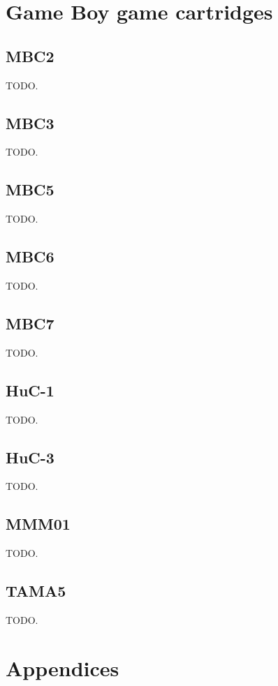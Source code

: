 \documentclass[a4paper, draft, oneside]{memoir}
\begin{document}
\part{Game Boy game cartridges}



\chapter{MBC2}

TODO.

\chapter{MBC3}

TODO.

\chapter{MBC5}

TODO.

\chapter{MBC6}

TODO.

\chapter{MBC7}

TODO.

\chapter{HuC-1}

TODO.

\chapter{HuC-3}

TODO.

\chapter{MMM01}

TODO.

\chapter{TAMA5}

TODO.

\part*{Appendices}

\begin{appendices}


\end{appendices}


\end{document}
